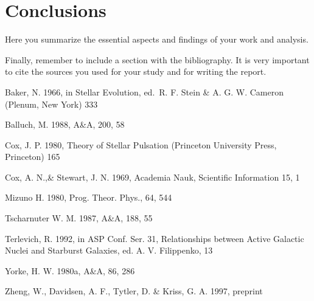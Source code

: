 \documentclass[a4paper,10pt]{article}
\begin{document}
\section{Conclusions}
Here you summarize the essential aspects and findings 
of your work and analysis.

Finally, remember to include a section with the bibliography.
It is very important to cite the sources you used for your study and
for writing the report.





\begin{thebibliography}{}

   Baker, N. 1966,
      in Stellar Evolution,
      ed.\ R. F. Stein \& A. G. W. Cameron
      (Plenum, New York) 333

    Balluch, M. 1988,
      A\&A, 200, 58

    Cox, J. P. 1980,
      Theory of Stellar Pulsation
      (Princeton University Press, Princeton) 165

    Cox, A. N.,\& Stewart, J. N. 1969,
      Academia Nauk, Scientific Information 15, 1

    Mizuno H. 1980,
      Prog. Theor. Phys., 64, 544
   
    Tscharnuter W. M. 1987,
      A\&A, 188, 55
  
    Terlevich, R. 1992, in ASP Conf. Ser. 31, 
      Relationships between Active Galactic Nuclei and Starburst Galaxies, 
      ed. A. V. Filippenko, 13

    Yorke, H. W. 1980a,
      A\&A, 86, 286

    Zheng, W., Davidsen, A. F., Tytler, D. \& Kriss, G. A.
      1997, preprint
\end{thebibliography}
\end{document}
